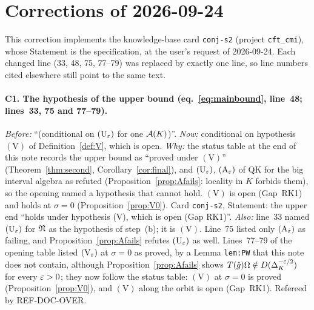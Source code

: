 \documentclass[11pt]{article}
\begin{document}
\section*{Corrections of 2026-09-24}
{\sloppy
This correction implements the knowledge-base card \texttt{conj-s2} (project \texttt{cft\_cmi}), whose
Statement is the specification, at the user's request of 2026-09-24.  Each changed line (33, 48, 75, 77--79) was replaced by
exactly one line, so line numbers cited elsewhere still point to the same text.
\paragraph{C1. The hypothesis of the upper bound (eq.~\eqref{eq:mainbound}, line~48; lines~33, 75 and 77--79).}
\emph{Before:} ``(conditional on \((\mathrm U_\varepsilon)\) for one \(\mathcal A(K)\))''.
\emph{Now:} conditional on hypothesis \((\mathrm V)\) of Definition~\ref{def:V}, which is open.
\emph{Why:} the status table at the end of this note records the upper bound as ``proved under
\((\mathrm V)\)'' (Theorem~\ref{thm:second}, Corollary~\ref{cor:final}), and \((\mathrm U_\varepsilon)\),
\((\mathrm A_\varepsilon)\) of QK for the big interval algebra as refuted (Proposition~\ref{prop:Afails}:
locality in \(K\) forbids them), so the opening named a hypothesis that cannot hold.  \((\mathrm V)\) is
open (Gap~RK1) and holds at \(\sigma=0\) (Proposition~\ref{prop:V0}).  Card \texttt{conj-s2}, Statement:
the upper end ``holds under hypothesis (V), which is open (Gap RK1)''.  \emph{Also:} line~33 named \((\mathrm U_\varepsilon)\) for \(\mathfrak N\) as the hypothesis of step~(b); it is \((\mathrm V)\).  Line~75 listed only \((\mathrm A_\varepsilon)\) as failing, and Proposition~\ref{prop:Afails} refutes \((\mathrm U_\varepsilon)\) as well.  Lines~77--79 of the opening table listed \((\mathrm V_\varepsilon)\) at \(\sigma=0\) as proved, by a Lemma \texttt{lem:PW} that this note does not contain, although Proposition~\ref{prop:Afails} shows \(T(\hat g)\Omega\notin D(\Delta_K^{-\varepsilon/2})\) for every \(\varepsilon>0\); they now follow the status table: \((\mathrm V)\) at \(\sigma=0\) is proved (Proposition~\ref{prop:V0}), and \((\mathrm V)\) along the orbit is open (Gap~RK1).  Refereed by REF-DOC-OVER.
\par}
\end{document}
